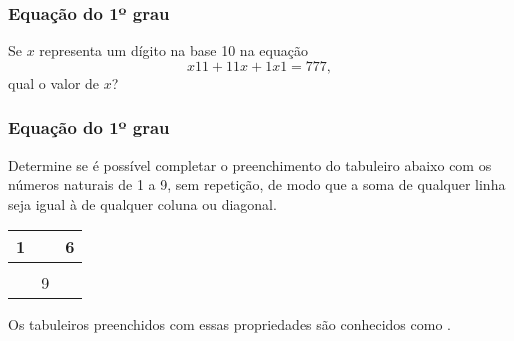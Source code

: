 \documentclass[brazil, notheorems, 10pt]{beamer}
\begin{document}
\begin{frame}
\frametitle{Equação do 1º grau} %


\begin{Exem}
Se $x$ representa um dígito na base 10 na equação $$x11 + 11x + 1x1
= 777,$$ qual o valor de $x$?
\end{Exem}
\end{frame}




\begin{frame}
\frametitle{Equação do 1º grau} %

\begin{Exem}
Determine se é possível completar o preenchimento do tabuleiro
abaixo com os números naturais de 1 a 9, sem repetição, de modo que
a soma de qualquer linha seja igual à de qualquer coluna ou
diagonal.

\begin{center}
\begin{tabular}{|c|c|c|}
	\hline
	1 &   & 6 \\ \hline
		&   &   \\ \hline
		& 9 &   \\
	\hline
\end{tabular}
\end{center}

\end{Exem}

Os tabuleiros preenchidos com essas propriedades são conhecidos como
.
\end{frame}



\end{document}
